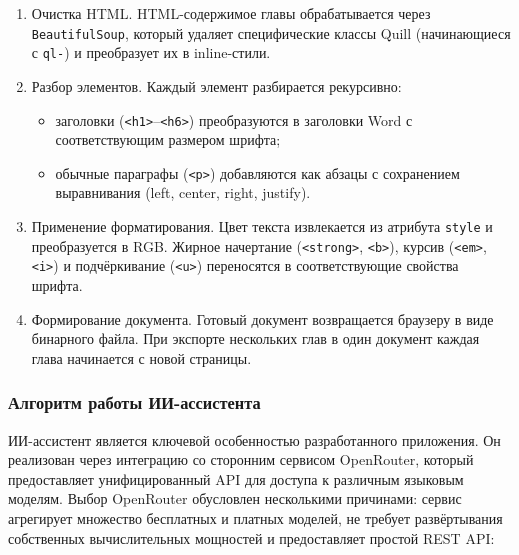 \begin{enumerate}
    \item Очистка HTML. HTML-содержимое главы обрабатывается через \texttt{BeautifulSoup}, который удаляет специфические классы Quill (начинающиеся с \texttt{ql-}) и преобразует их в inline-стили.
    \item Разбор элементов. Каждый элемент разбирается рекурсивно:
    \begin{itemize}
        \item заголовки (\texttt{<h1>}–\texttt{<h6>}) преобразуются в заголовки Word с соответствующим размером шрифта;
        \item обычные параграфы (\texttt{<p>}) добавляются как абзацы с сохранением выравнивания (left, center, right, justify).
    \end{itemize}
    
    \item Применение форматирования. Цвет текста извлекается из атрибута \texttt{style} и преобразуется в RGB. Жирное начертание (\texttt{<strong>}, \texttt{<b>}), курсив (\texttt{<em>}, \texttt{<i>}) и подчёркивание (\texttt{<u>}) переносятся в соответствующие свойства шрифта.
    
    \item Формирование документа. Готовый документ возвращается браузеру в виде бинарного файла. При экспорте нескольких глав в один документ каждая глава начинается с новой страницы.
\end{enumerate}

\subsubsection{Алгоритм работы ИИ-ассистента}

ИИ-ассистент является ключевой особенностью разработанного приложения. Он реализован через интеграцию со сторонним сервисом OpenRouter, который предоставляет унифицированный API для доступа к различным языковым моделям. Выбор OpenRouter обусловлен несколькими причинами: сервис агрегирует множество бесплатных и платных моделей, не требует развёртывания собственных вычислительных мощностей и предоставляет простой REST API:

